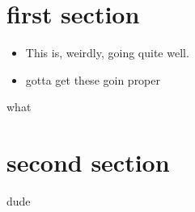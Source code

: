 \documentclass{shard}
\begin{document}
    \titleframe
    \section{first section}
    \begin{frame}
        \begin{itemize}
            \item[\bdot]\;\;This is, weirdly, going quite well.
            \item[\bdot]\;\;gotta get these goin proper
        \end{itemize}
    \end{frame}
    \begin{frame}
        what
    \end{frame}
    \section{second section}
    \begin{frame}
        dude
    \end{frame}
\end{document}
